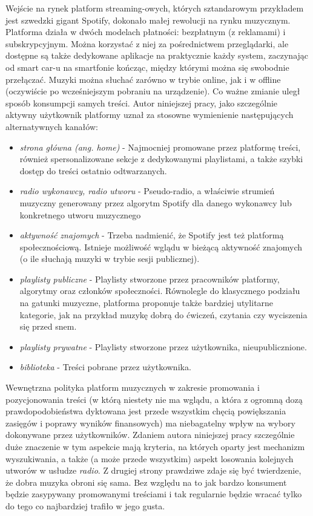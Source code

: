 \documentclass[a4paper,11pt]{article}
\begin{document}
    \bigskip

    Wejście na rynek platform streaming-owych, których sztandarowym przykładem jest szwedzki gigant Spotify, dokonało małej rewolucji na rynku muzycznym. Platforma działa w dwóch modelach płatności: bezpłatnym (z reklamami) i subskrypcyjnym. Można korzystać z niej za pośrednictwem przeglądarki, ale dostępne są także dedykowane aplikacje na praktycznie każdy system, zaczynając od smart car-u na smartfonie kończąc, między którymi można się swobodnie przełączać. Muzyki można słuchać zarówno w trybie online, jak i w offline (oczywiście po wcześniejszym pobraniu na urządzenie). Co ważne zmianie uległ sposób konsumpcji samych treści. Autor niniejszej pracy, jako szczególnie aktywny użytkownik platformy uznał za stosowne wymienienie następujących alternatywnych kanałów:
    \begin{itemize}
        \item \textit{strona główna (ang. home)} - Najmocniej promowane przez platformę treści, również spersonalizowane sekcje z dedykowanymi playlistami, a także szybki dostęp do treści ostatnio odtwarzanych.
        \item \textit{radio wykonawcy, radio utworu} - Pseudo-radio, a właściwie strumień muzyczny generowany przez algorytm Spotify dla danego wykonawcy lub konkretnego utworu muzycznego
        \item \textit{aktywność znajomych} - Trzeba nadmienić, że Spotify jest też platformą społecznościową. Istnieje możliwość wglądu w bieżącą aktywność znajomych (o ile słuchają muzyki w trybie sesji publicznej).
        \item \textit{playlisty publiczne} - Playlisty stworzone przez pracowników platformy, algorytmy oraz członków społeczności. Równolegle do klasycznego podziału na gatunki muzyczne, platforma proponuje także bardziej utylitarne kategorie, jak na przykład muzykę dobrą do ćwiczeń, czytania czy wyciszenia się przed snem.
        \item \textit{playlisty prywatne} - Playlisty stworzone przez użytkownika, nieupublicznione.
        \item \textit{biblioteka} - Treści pobrane przez użytkownika.
    \end{itemize}

    \bigskip

    Wewnętrzna polityka platform muzycznych w zakresie promowania i pozycjonowania treści (w którą niestety nie ma wglądu, a która z ogromną dozą prawdopodobieństwa dyktowana jest przede wszystkim chęcią powiększania zasięgów i poprawy wyników finansowych) ma niebagatelny wpływ na wybory dokonywane przez użytkowników\cite{PreferencjeMuzyczneWCzasachSteamingu2020}. Zdaniem autora niniejszej pracy szczególnie duże znaczenie w tym aspekcie mają kryteria, na których oparty jest mechanizm wyszukiwania, a także (a może przede wszystkim) aspekt losowania kolejnych utworów w usłudze \textit{radio}. Z drugiej strony prawdziwe zdaje się być twierdzenie, że dobra muzyka obroni się sama. Bez względu na to jak bardzo konsument będzie zasypywany promowanymi treściami i tak regularnie będzie wracać tylko do tego co najbardziej trafiło w jego gusta.
\end{document}
